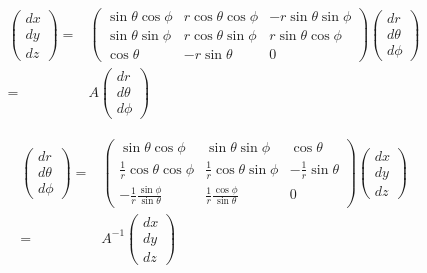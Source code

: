 \documentclass{jsarticle}
\begin{document}
\begin{align*}
\left(
\begin{array}{c}
dx\\
dy\\
dz
\end{array}
\right)
=&
\left(
\begin{array}{rrr}
\sin{\theta} \cos{\phi}&r \cos{\theta} \cos{\phi}& -r \sin{\theta} \sin{\phi} \\
\sin{\theta} \sin {\phi}&r \cos{\theta} \sin{\phi}&  r \sin{\theta} \cos{\phi} \\
\cos{\theta} & -r \sin{\theta} & 0
\end{array}
\right)
\left(
\begin{array}{c}
dr\\
d\theta\\
d\phi
\end{array}
\right)\\
= &
A
\left(
\begin{array}{c}
dr\\
d\theta\\
d\phi
\end{array}
\right)
\end{align*}

\begin{align*}
\left(
\begin{array}{c}
dr\\
d\theta\\
d\phi
\end{array}
\right)
= &
\left(
\begin{array}{rrr}
\sin \theta \cos \phi & \sin \theta \sin \phi & \cos \theta\\
\frac{1}{r} \cos \theta \cos \phi & \frac{1}{r} \cos \theta \sin \phi & -\frac{1}{r} \sin \theta\\
- \frac{1}{r} \frac{\sin \phi}{\sin \theta } & \frac{1}{r} \frac{\cos \phi}{\sin \theta} & 0
\end{array}
\right)
\left(
\begin{array}{c}
dx\\
dy\\
dz
\end{array}
\right)\\
= & 
A^{-1}
\left(
\begin{array}{c}
dx\\
dy\\
dz
\end{array}
\right)
\end{align*}
\end{document}
